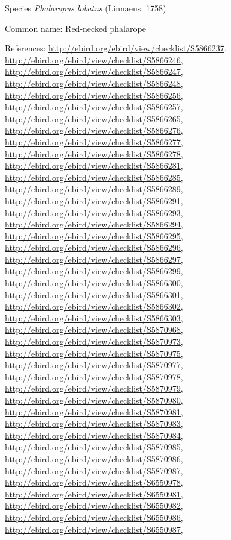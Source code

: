 \documentclass[9pt, article]{memoir}
\begin{document}
\begin{multicols}{2}
\vspace{6pt}\noindent\hspace{36pt}Species \textit{Phalaropus lobatus} (Linnaeus, 1758)


Common name: Red-necked phalarope

References: 
\url{http://ebird.org/ebird/view/checklist/S5866237}, 
\url{http://ebird.org/ebird/view/checklist/S5866246}, 
\url{http://ebird.org/ebird/view/checklist/S5866247}, 
\url{http://ebird.org/ebird/view/checklist/S5866248}, 
\url{http://ebird.org/ebird/view/checklist/S5866256}, 
\url{http://ebird.org/ebird/view/checklist/S5866257}, 
\url{http://ebird.org/ebird/view/checklist/S5866265}, 
\url{http://ebird.org/ebird/view/checklist/S5866276}, 
\url{http://ebird.org/ebird/view/checklist/S5866277}, 
\url{http://ebird.org/ebird/view/checklist/S5866278}, 
\url{http://ebird.org/ebird/view/checklist/S5866281}, 
\url{http://ebird.org/ebird/view/checklist/S5866285}, 
\url{http://ebird.org/ebird/view/checklist/S5866289}, 
\url{http://ebird.org/ebird/view/checklist/S5866291}, 
\url{http://ebird.org/ebird/view/checklist/S5866293}, 
\url{http://ebird.org/ebird/view/checklist/S5866294}, 
\url{http://ebird.org/ebird/view/checklist/S5866295}, 
\url{http://ebird.org/ebird/view/checklist/S5866296}, 
\url{http://ebird.org/ebird/view/checklist/S5866297}, 
\url{http://ebird.org/ebird/view/checklist/S5866299}, 
\url{http://ebird.org/ebird/view/checklist/S5866300}, 
\url{http://ebird.org/ebird/view/checklist/S5866301}, 
\url{http://ebird.org/ebird/view/checklist/S5866302}, 
\url{http://ebird.org/ebird/view/checklist/S5866303}, 
\url{http://ebird.org/ebird/view/checklist/S5870968}, 
\url{http://ebird.org/ebird/view/checklist/S5870973}, 
\url{http://ebird.org/ebird/view/checklist/S5870975}, 
\url{http://ebird.org/ebird/view/checklist/S5870977}, 
\url{http://ebird.org/ebird/view/checklist/S5870978}, 
\url{http://ebird.org/ebird/view/checklist/S5870979}, 
\url{http://ebird.org/ebird/view/checklist/S5870980}, 
\url{http://ebird.org/ebird/view/checklist/S5870981}, 
\url{http://ebird.org/ebird/view/checklist/S5870983}, 
\url{http://ebird.org/ebird/view/checklist/S5870984}, 
\url{http://ebird.org/ebird/view/checklist/S5870985}, 
\url{http://ebird.org/ebird/view/checklist/S5870986}, 
\url{http://ebird.org/ebird/view/checklist/S5870987}, 
\url{http://ebird.org/ebird/view/checklist/S6550978}, 
\url{http://ebird.org/ebird/view/checklist/S6550981}, 
\url{http://ebird.org/ebird/view/checklist/S6550982}, 
\url{http://ebird.org/ebird/view/checklist/S6550986}, 
\url{http://ebird.org/ebird/view/checklist/S6550987}, 

\end{multicols}
\end{document}
